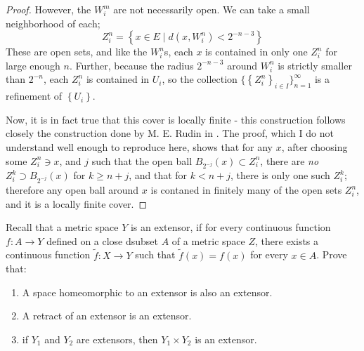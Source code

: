 \documentclass[12pt]{article}
\theoremstyle{definition}
\newenvironment{problem}[2][Problem]{\begin{trivlist}
\item[\hskip \labelsep {\bfseries #1}\hskip \labelsep {\bfseries #2.}]}{\end{trivlist}}
\begin{document}
\begin{proof}
	\par However, the $W_i^m$ are not necessarily open. We can take a small neighborhood of each; 
	\[ Z_i^n = \left\{ x \in E \mid d(x, W_i^{n}) < 2^{-n-3} \right\} \]
	These are open sets, and like the $W_i^n$s, each $x$ is contained in only one $Z_i^n$ for large enough $n$. Further, because the radius $2^{-n-3}$ around $W_i^n$ is strictly smaller than $2^{-n}$, each $Z_i^n$ is contained in $U_i$, so the collection $\{\left\{ Z_i^n \right\}_{i\in I}\}_{n=1}^\infty$ is a refinement of $\left\{ U_i \right\}$.
	\par Now, it is in fact true that this cover is locally finite - this construction follows closely the construction done by M. E. Rudin in \cite{rudin}. The proof, which I do not understand well enough to reproduce here, shows that for any $x$, after choosing some $Z_i^n \ni x$, and $j$ such that the open ball $B_{2^{-j}}(x) \subset Z_i^n$, there are \textit{no} $Z_i^k \supset B_{2^{-j}}(x)$ for $k \geq n + j$, and that for $k < n + j$, there is only one such $Z_i^k$; therefore any open ball around $x$ is contaned in finitely many of the open sets $Z_i^n$, and it is a locally finite cover.
\end{proof}
\begin{problem}{2}
Recall that a metric space $Y$ is an extensor, if for every continuous function $f: A \to Y$ defined on a close dsubset $A$ of a metric space $Z$, there exists a continuous function $\tilde f: X \to Y$ such that $\tilde f (x) = f(x)$ for every $x \in A$.   
Prove that:
\begin{enumerate}[label=(\roman*)]
    \item A space homeomorphic to an extensor is also an extensor.
    \item A retract of an extensor is an extensor.
    \item if $Y_1$ and $Y_2$ are extensors, then $Y_1 \times Y_2$ is an extensor.
\end{enumerate}
\end{problem}
\end{document}
